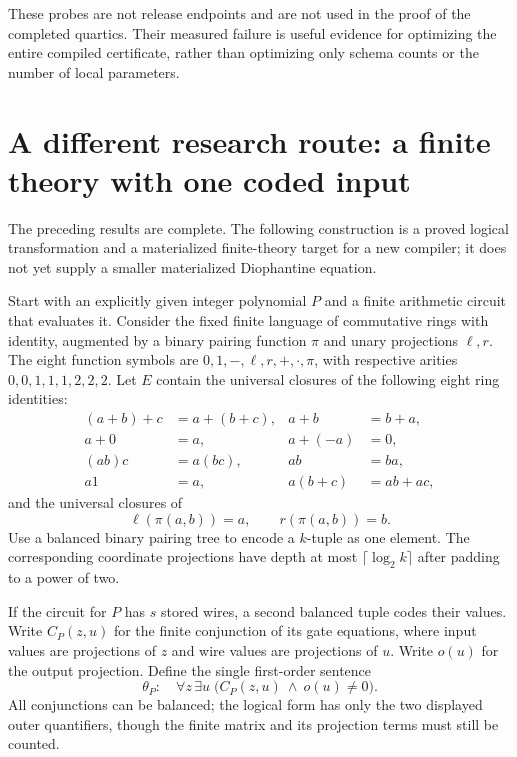 \documentclass[11pt]{article}
\theoremstyle{remark}\newtheorem{remark}[theorem]{Remark}
\begin{document}
These probes are not release endpoints and are not used in the proof of
the completed quartics. Their measured failure is useful evidence for
optimizing the entire compiled certificate, rather than optimizing only
schema counts or the number of local parameters.

\section{A different research route: a finite theory with one coded input}
\label{sec:grounding}

The preceding results are complete. The following construction is a
proved logical transformation and a materialized finite-theory target
for a new compiler; it does not yet supply a smaller materialized
Diophantine equation.

Start with an explicitly given integer polynomial $P$ and a finite
arithmetic circuit that evaluates it. Consider the fixed finite language
of commutative rings with identity, augmented by a binary pairing
function $\pi$ and unary projections $\ell,r$. The eight function symbols
are $0,1,-,\ell,r,+,\cdot,\pi$, with respective arities
$0,0,1,1,1,2,2,2$. Let $E$ contain the universal closures of the following
eight ring identities:
\begin{align*}
(a+b)+c&=a+(b+c), & a+b&=b+a,\\
a+0&=a, & a+(-a)&=0,\\
(ab)c&=a(bc), & ab&=ba,\\
a1&=a, & a(b+c)&=ab+ac,
\end{align*}
and the universal closures of
\[
\ell(\pi(a,b))=a,\qquad r(\pi(a,b))=b.
\]
Use a balanced binary pairing tree to encode a $k$-tuple as one element.
The corresponding coordinate projections have depth at most
$\lceil\log_2 k\rceil$ after padding to a power of two.

If the circuit for $P$ has $s$ stored wires, a second balanced tuple
codes their values. Write $C_P(z,u)$ for the finite conjunction of its
gate equations, where input values are projections of $z$ and wire
values are projections of $u$. Write $o(u)$ for the output projection.
Define the single first-order sentence
\begin{equation}\label{eq:theta}
\theta_P:\quad \forall z\,\exists u\;
\bigl(C_P(z,u)\ \wedge\ o(u)\ne0\bigr).
\end{equation}
All conjunctions can be balanced; the logical form has only the two
displayed outer quantifiers, though the finite matrix and its projection
terms must still be counted.
\end{document}

